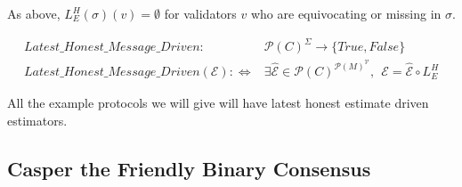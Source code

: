 As above, $L^H_E(\sigma)(v) = \emptyset$ for validators $v$ who are equivocating or missing in $\sigma$.

\begin{defn}
\begin{align*}
Latest\_Honest\_Message\_Driven:& \mathcal{P}(C)^\Sigma \to \{True, False\} \\
Latest\_Honest\_Message\_Driven(\mathcal{E}) :\Leftrightarrow& \exists \hat{\mathcal{E}} \in \mathcal{P}(C)^{\mathcal{P}(M)^\mathcal{V}}, ~~\mathcal{E} = \hat{\mathcal{E}} \circ L^H_E
\end{align*}
\end{defn}

All the example protocols we will give will have latest honest estimate driven estimators.

\iffalse
We define ``!", an operator used to return the single element of a singleton set:
\begin{defn}
$$
!: \mathcal{P}(X) \to X
$$
$$
!(A) = a \in A : \forall b \in A, b = a
$$
\end{defn}

Note that it is not defined when its argument is not singleton (i.e. when it is a multi-element or empty set).

\begin{defn}[Properties of Consensus Values]
\begin{align*}
P_{\mathcal{C}} = \{True, False\}^{\mathcal{C}}
\end{align*}
\end{defn}
\fi



\subsection{Casper the Friendly Binary Consensus}

